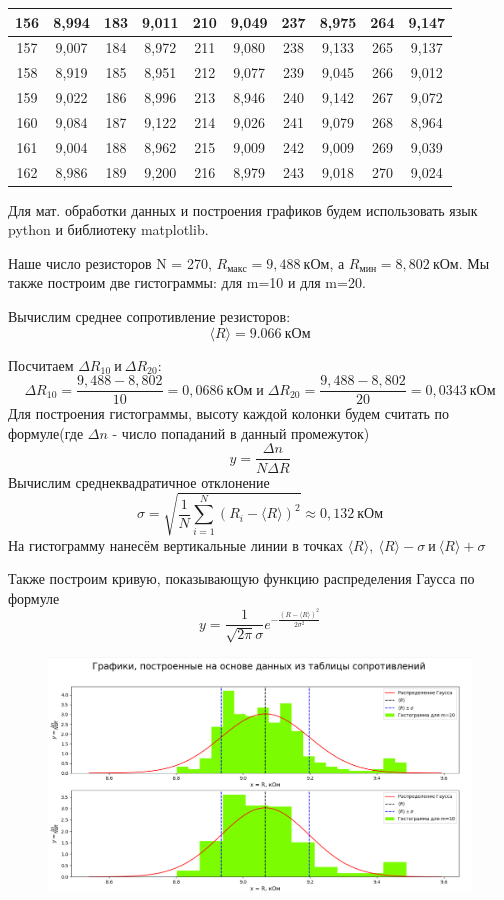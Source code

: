 \documentclass[a4paper, 12pt]{article}
\begin{document}
\begin{longtable}[H]{|c|c|c|c|c|c|c|c|c|c|}
			156 & 8,994 & 183 & 9,011 & 210 & 9,049 & 237 & 8,975 & 264 & 9,147 \\ \hline
			157 & 9,007 & 184 & 8,972 & 211 & 9,080 & 238 & 9,133 & 265 & 9,137 \\ \hline
			158 & 8,919 & 185 & 8,951 & 212 & 9,077 & 239 & 9,045 & 266 & 9,012 \\ \hline
			159 & 9,022 & 186 & 8,996 & 213 & 8,946 & 240 & 9,142 & 267 & 9,072 \\ \hline
			160 & 9,084 & 187 & 9,122 & 214 & 9,026 & 241 & 9,079 & 268 & 8,964 \\ \hline
			161 & 9,004 & 188 & 8,962 & 215 & 9,009 & 242 & 9,009 & 269 & 9,039 \\ \hline
			162 & 8,986 & 189 & 9,200 & 216 & 8,979 & 243 & 9,018 & 270 & 9,024 \\ \hline
		\end{longtable}
		Для мат. обработки данных и построения графиков будем использовать язык python и библиотеку matplotlib.
		\par
		Наше число резисторов N = 270, $R_{макс} = 9,488\: кОм$, а $R_{мин} = 8,802\: кОм$. Мы также построим две гистограммы: для m=10 и для m=20.
		\par
		Вычислим среднее сопротивление резисторов:
		$$\langle R\rangle=9.066\:кОм$$
		\par
		Посчитаем $\Delta R_{10}\:и\:\Delta R_{20}$:
		$$\Delta R_{10} = \frac{9,488-8,802}{10} = 0,0686\:кОм\;и\;\Delta R_{20}=\frac{9,488-8,802}{20}=0,0343\:кОм$$
		Для построения гистограммы, высоту каждой колонки будем считать по формуле(где $\Delta n$ - число попаданий в данный промежуток)
		$$y=\frac{\Delta n}{N \Delta R}$$
		Вычислим среднеквадратичное отклонение
		$$ \sigma = \sqrt{\frac{1}{N} \sum_{i = 1}^{N}(R_i - \langle R\rangle)^2}\approx 0,132\: кОм$$
		На гистограмму нанесём вертикальные линии в точках $\langle R\rangle ,\: \langle R\rangle-\sigma\: и\: \langle R\rangle+\sigma$
		\par
		Также построим кривую, показывающую функцию распределения Гаусса по формуле
		$$y=\frac{1}{\sqrt{2\pi}\sigma}e^{-\frac{(R-\langle R\rangle)^2}{2\sigma^2}}$$
		\begin{figure}[h!]
			\includegraphics[width=\linewidth]{Graphics-1}
		\end{figure}
\end{document}
